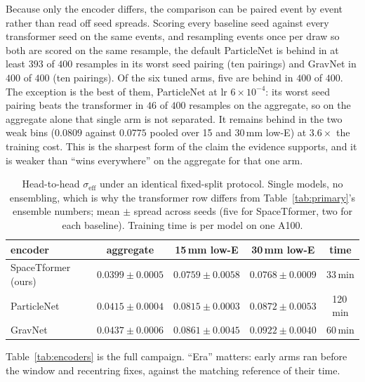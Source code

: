 \documentclass[11pt,a4paper]{article}
\newcommand{\seff}{\ensuremath{\sigma_{\mathrm{eff}}}}
\begin{document}
Because only the encoder differs, the comparison can be paired event by
event rather than read off seed spreads. Scoring every baseline seed against
every transformer seed on the same events, and resampling events once per
draw so both are scored on the same resample, the default ParticleNet is
behind in at least $393$ of $400$ resamples in its worst seed pairing (ten
pairings) and GravNet in $400$ of $400$ (ten pairings). Of the six tuned
arms, five are behind in $400$ of $400$. The exception is the best of them,
ParticleNet at lr $6\times10^{-4}$: its worst seed pairing beats the
transformer in $46$ of $400$ resamples on the aggregate, so on the aggregate
alone that single arm is not separated. It remains behind in the two weak
bins ($0.0809$ against $0.0775$ pooled over 15 and 30\,mm low-E) at
$3.6\times$ the training cost. This is the sharpest form of the claim the
evidence supports, and it is weaker than ``wins everywhere'' on the
aggregate for that one arm.

\begin{table}[h]
\centering
\caption{Head-to-head \seff{} under an identical fixed-split protocol.
Single models, no ensembling, which is why the transformer row differs from
Table~\ref{tab:primary}'s ensemble numbers; mean $\pm$ spread across seeds
(five for SpaceTformer, two for each baseline). Training time is per model
on one A100.}
\label{tab:h2h}
\small
\setlength{\tabcolsep}{4.5pt}
\begin{tabular}{lcccc}
\toprule
encoder & aggregate & 15\,mm low-E & 30\,mm low-E & time\\
\midrule
SpaceTformer (ours) & $\mathbf{0.0399 \pm 0.0005}$ & $\mathbf{0.0759 \pm 0.0058}$ & $\mathbf{0.0768 \pm 0.0009}$ & 33\,min\\
ParticleNet & $0.0415 \pm 0.0004$ & $0.0815 \pm 0.0003$ & $0.0872 \pm 0.0053$ & 120\,min\\
GravNet & $0.0437 \pm 0.0006$ & $0.0861 \pm 0.0045$ & $0.0922 \pm 0.0040$ & 60\,min\\
\bottomrule
\end{tabular}
\end{table}

Table~\ref{tab:encoders} is the full campaign. ``Era'' matters: early arms
ran before the window and recentring fixes, against the matching reference
of their time.
\end{document}
